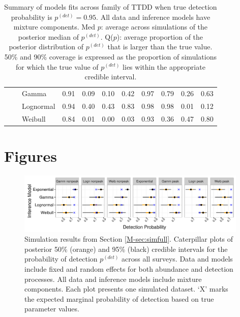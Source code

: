 \documentclass[useAMS,usenatbib,referee,12pt]{article}
\newcommand{\pdet}{p^{(det)}}
\begin{document}
\begin{table}[ht]
\begin{tabular}{l|l|l|cccc|cccc}
\cline{2-11}
& \parbox[t]{2mm}{}  & Gamma & 0.91 & 0.09 & 0.10 & 0.42 & 0.97 & 0.79 & 0.26 & 0.63 \\ 
   &  & Lognormal & 0.94 & 0.40 & 0.43 & 0.83 & 0.98 & 0.98 & 0.01 & 0.12 \\ 
   &  & Weibull & 0.84 & 0.01 & 0.00 & 0.03 & 0.93 & 0.36 & 0.47 & 0.80 \\ 
   \hline
\end{tabular}
\caption{Summary of models fits across family of TTDD when true detection probability is $\pdet = 0.95$.
All data and inference models have mixture components.
Med $p$: average across simulations of the posterior median of $\pdet$.  
Q($p$): average proportion of the posterior distribution of $\pdet$ that is larger than the true value.  
50\% and 90\% coverage is expressed as the proportion of simulations for which the true value of $\pdet$ lies within the appropriate credible interval.}
\label{tbl:fam95}
\end{table}

\FloatBarrier



\section{Figures}

\begin{figure}[h!]\centering
\includegraphics[width=0.98\textwidth]{Sims/SimFull/pdet_cater_family} %
\caption{\label{pdet_cater_family}  Simulation results from Section \ref{M-sec:simfull}.
Caterpillar plots of posterior 50\% (orange) and 95\% (black) credible intervals for the probability of detection $\pdet$ across all surveys.
Data and models include fixed and random effects for both abundance and detection processes.
All data and inference models include mixture components.  
Each plot presents one simulated dataset.  
`X' marks the expected marginal probability of detection based on true parameter values.}
\end{figure}
\end{document}
